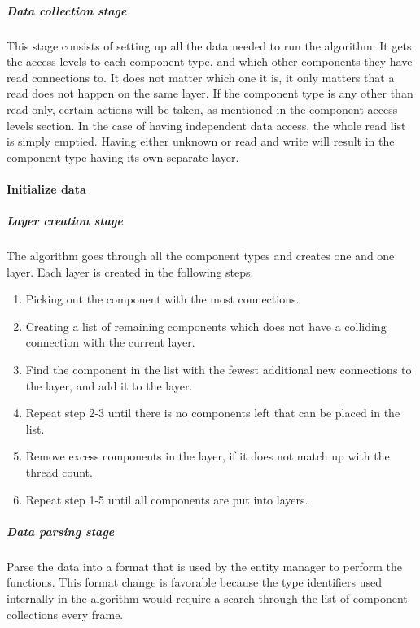 \subparagraph{Data collection stage}
This stage consists of setting up all the data needed to run the algorithm.
It gets the access levels to each component type, and which other components they have read connections to.
It does not matter which one it is, it only matters that a read does not happen on the same layer.
If the component type is any other than read only, certain actions will be taken, as mentioned in the component access levels section.
In the case of having independent data access, the whole read list is simply emptied.
Having either unknown or read and write will result in the component type having its own separate layer.

\paragraph{Initialize data}


\subparagraph{Layer creation stage}
The algorithm goes through all the component types and creates one and one layer.
Each layer is created in the following steps.

\begin{enumerate}
    \item Picking out the component with the most connections.

    \item Creating a list of remaining components which does not have a colliding connection with the current layer.

    \item Find the component in the list with the fewest additional new connections to the layer, and add it to the layer.

    \item Repeat step 2-3 until there is no components left that can be placed in the list.

    \item Remove excess components in the layer, if it does not match up with the thread count.

    \item Repeat step 1-5 until all components are put into layers.
\end{enumerate}

\subparagraph{Data parsing stage}
Parse the data into a format that is used by the entity manager to perform the functions.
This format change is favorable because the type identifiers used internally in the algorithm would require a search through the list of component collections every frame.

